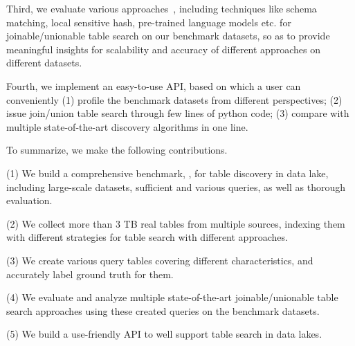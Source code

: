 Third, we evaluate various approaches~\cc{\cite{}}, including techniques like schema matching, local sensitive hash,  pre-trained language models etc. for joinable/unionable table search on our benchmark datasets, so as to provide meaningful insights for scalability and accuracy of different approaches on different datasets.

Fourth, we implement an easy-to-use API, based on which a user can conveniently (1) profile the benchmark datasets from different perspectives;
(2) issue join/union table search through few lines of python code;
(3) compare with multiple state-of-the-art discovery algorithms in one line. 

To summarize, we make the following contributions.

\noindent (1) We build a comprehensive benchmark, \sys, for table discovery in data lake, including large-scale datasets, sufficient and various queries, as well as thorough evaluation.  

\noindent (2) We collect more than 3 TB real tables from multiple sources, indexing them with different strategies for table search with different approaches.  

\noindent (3) We create various query tables covering different characteristics, and accurately label ground truth for them.

\noindent (4) We evaluate and analyze multiple state-of-the-art joinable/unionable table search approaches using these created queries on the benchmark datasets.

\noindent (5) We build a use-friendly API to well support table search in data lakes. 

  
